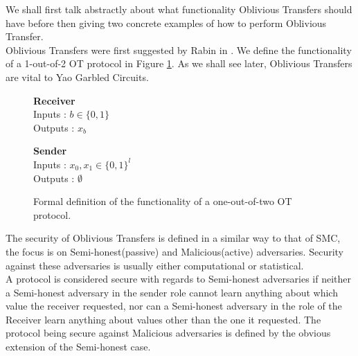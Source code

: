 \documentclass[ %
                    author={Nicholas Tutte},
                supervisor={Prof. Nigel Smart},
                    degree={MEng},
                     title={Secure Two Party Computation},
                  subtitle={A practical comparison of recent protocols},
                      type={Research - GG1K},
                      year={2015} ]{dissertation}
\begin{document}
			We shall first talk abstractly about what functionality Oblivious Transfers should have before then giving two concrete examples of how to perform Oblivious Transfer.\\

			Oblivious Transfers were first suggested by Rabin in \cite{Rabin81}. We define the functionality of a 1-out-of-2 OT protocol in Figure \ref{fig:OTformalDef}. As we shall see later, Oblivious Transfers are vital to Yao Garbled Circuits. 

			\begin{figure}[!htb]
				\centering
				\begin{minipage}{0.45\textwidth}
					\centering
					\textbf{Receiver}\\
					Inputs : $b \in \{0, 1\}$\\
					Outputs : $x_b$\\
				\end{minipage}
				\begin{minipage}{0.45\textwidth}
					\centering
					\textbf{Sender}\\
					Inputs : $x_0, x_1 \in \{0, 1\}^l$\\
					Outputs : $\emptyset$\\
				\end{minipage}

				\caption{ Formal definition of the functionality of a one-out-of-two OT protocol.\label{fig:OTformalDef}}
			\end{figure}

			The security of Oblivious Transfers is defined in a similar way to that of SMC, the focus is on Semi-honest(passive) and Malicious(active) adversaries. Security against these adversaries is usually either computational or statistical.\\

			A protocol is considered secure with regards to Semi-honest adversaries if neither a Semi-honest adversary in the sender role cannot learn anything about which value the receiver requested, nor can a Semi-honest adversary in the role of the Receiver learn anything about values other than the one it requested. The protocol being secure against Malicious adversaries is defined by the obvious extension of the Semi-honest case.\\
\end{document}
